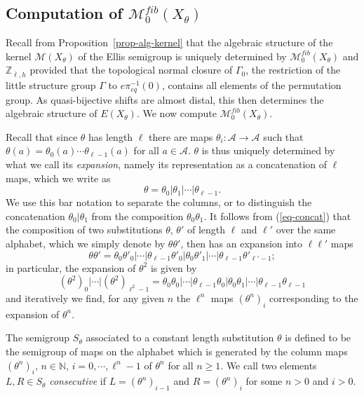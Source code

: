 \documentclass[12pt]{amsart}
\theoremstyle{definition}
\numberwithin{equation}{section}
\newcommand{\Z}{\mathbb Z}
\newcommand{\N}{\mathbb N}
\newcommand{\Aa}{{\mathcal A}}
\newcommand{\pe}{\pi_{eq}}
\newcommand{\M}{\mathcal M}
\begin{document}
\subsection{Computation of $\M^{fib}_0(X_\theta)$}\label{structural-section} 
Recall from Proposition~\ref{prop-alg-kernel} that the algebraic structure of the kernel $\M(X_\theta)$ of the Ellis semigroup is uniquely determined by  $\M_0^{fib}(X_\theta)$ and 
$\Z_{\bar{\ell},h}$ provided that the topological normal closure of $\Gamma_0$,  the restriction of the little structure group $\Gamma$ to $e\pe^{-1}(0)$, contains all elements of the permutation group. As quasi-bijective shifts are almost distal, this then determines the algebraic structure of $E(X_\theta)$. We now compute $\M^{fib}_0(X_\theta)$.

Recall that since $\theta$ has length $\ell$ there are maps  $\theta_i:\mathcal A \rightarrow \mathcal A$ such that
$
\theta(a) = \theta_0(a)\cdots \theta_{\ell-1}(a)
$
for all $a\in\Aa$.
$\theta$ is thus uniquely determined by what we call its {\em expansion}, namely its representation as a concatenation of $\ell$ maps, which we write as
$$\theta = \theta_0|\theta_1|\cdots |\theta_{\ell-1}.$$
We use this bar notation to separate the columns, or  to distinguish the concatenation $ \theta_0|\theta_1$  from the composition $ \theta_0\theta_1$.
It follows from (\ref{eq-concat}) that 
the composition of two substitutions $\theta$, $\theta'$ of length $\ell$ and $\ell'$ over the same alphabet, which we simply denote by $\theta \theta'$, then has  an expansion into
$\ell \ell'$ maps
\begin{equation}\nonumber
\theta \theta' = \theta_0\theta'_0 |\cdots |\theta_{\ell-1}\theta'_0|\theta_0\theta'_1| \cdots |
\theta_{\ell-1}\theta'_{\ell'-1}; 
\end{equation}
in particular, the expansion of $\theta^2$ is given by 
\begin{equation}\label{expansion}
(\theta^2)_0|\cdots |(\theta^2)_{\ell^2-1} = \theta_0\theta_0 | \cdots |\theta_{\ell - 1}\theta_{0}|  \theta_0\theta_1 |  \cdots |\theta_{\ell-1}\theta_{\ell-1} 
\end{equation}
and iteratively we find, for any given $n$ the $\ell^n$ maps $(\theta^n)_i$ corresponding to the expansion of $\theta^n$. 




The semigroup $S_\theta$ associated to a constant length substitution $\theta$ is defined to be the semigroup of maps on the alphabet which is generated by the column maps $(\theta^n)_i$, $n\in\N$, $i=0,\cdots,\ell^n-1$ of $\theta^n$ for all $n\geq 1$. We call two elements $L,R\in S_\theta$ \emph{consecutive} if $L=(\theta^n)_{i-1}$ and $R=(\theta^n)_i$ for some $n>0$ and $i>0$.
\end{document}

